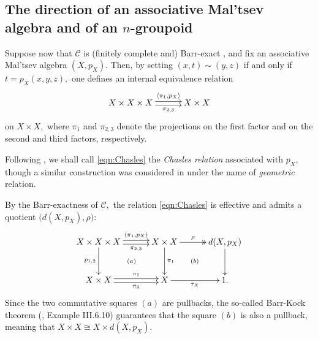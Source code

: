 \documentclass[11pt]{amsart}
\theoremstyle{plain}
\theoremstyle{definition}
\theoremstyle{remark}
\begin{document}
\subsection{The direction of an associative Mal'tsev algebra and of an $n$-groupoid}
Suppose now that $\mathcal{C}$ is (finitely complete and) Barr-exact \cite{barr}, and fix an associative Mal'tsev algebra $(X,p_X).$ Then, by setting $(x,t)\sim(y,z)$ if and only if $t=p_X(x,y,z),$ one defines an internal equivalence relation
\begin{equation}
\label{eqn:Chasles}
\xymatrixcolsep{2.5pc}
\xymatrix{
{X\times X\times X} \ar@<.5ex>[r]^-{\langle \pi_1,p_X\rangle} \ar@<-.5ex>[r]_-{\pi_{2,3}} &{X\times X}
}
\end{equation}
on $X\times X,$  where $\pi_1$ and $\pi_{2,3}$ denote the projections on the first factor and on the second and third factors, respectively.

Following \cite{baer-sums}, we shall call \eqref{eqn:Chasles} the \emph{Chasles relation} associated with $p_X,$ though a similar construction was considered in \cite{kock} under the name of \emph{geometric} relation.

By the Barr-exactness of $\mathcal{C},$ the relation \eqref{eqn:Chasles} is effective and admits a quotient $\big(d(X,p_X),\rho\big)$:
\begin{equation*}
\xymatrixrowsep{2.5pc}
\xymatrixcolsep{2.5pc}
\xymatrix{
{X\times X\times X} \ar[d]_-{p_{1,2}} \ar@{}[rd]|{(a)} \ar@<.5ex>[r]^-{\langle \pi_1,p_X\rangle} \ar@<-.5ex>[r]_-{\pi_{2,3}} &{X\times X} \ar[d]^-{\pi_1} \ar@{->>}[r]^-{\rho} \ar@{}[rd]|{(b)} &{d(X,p_X)} \ar[d] \\
{X\times X} \ar@<.5ex>[r]^-{\pi_1} \ar@<-.5ex>[r]_-{\pi_2} &{X} \ar[r]_-{\tau_X} &{1.}
}
\end{equation*}
Since the two commutative squares $(a)$ are pullbacks, the so-called Barr-Kock theorem (\cite{barr}, Example III.6.10) guarantees that the square $(b)$ is also a pullback, meaning that $X\times X\cong X\times d(X,p_X).$
\end{document}
